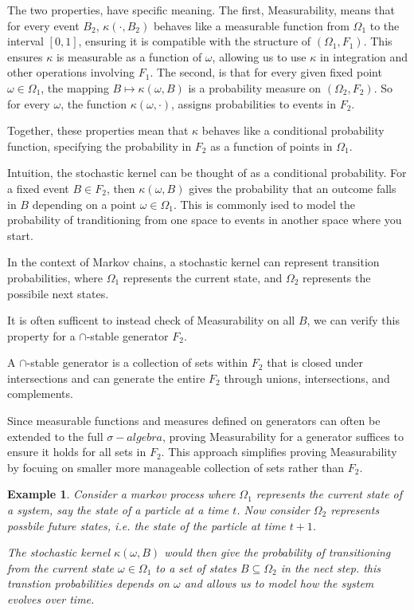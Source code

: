 \documentclass{article}
\newtheorem{example}{Example}
\begin{document}
The two properties, have specific meaning. The first, Measurability, means that for every event $B_2$, $\kappa(\cdot, B_2)$ behaves like a measurable function from $\Omega_1$ to the interval $[0,1]$, ensuring it is compatible with the structure of $(\Omega_1, F_1)$. This ensures $\kappa$ is measurable as a function of $\omega$, allowing us to use $\kappa$ in integration and other operations involving $F_1$. 
The second, is that for every given fixed point $\omega \in \Omega_1$, the mapping 
$B \mapsto \kappa(\omega, B)$ is a probability measure on 
$(\Omega_2, F_2)$. So for every $\omega$, the function $\kappa(\omega, \cdot)$, assigns probabilities to events in $F_2$. 
\par Together, these properties mean that $\kappa$ behaves like a conditional probability function, specifying the probability in $F_2$ as a function of points in $\Omega_1$. 
\par Intuition, the stochastic kernel can be thought of as a conditional probability. For a fixed event $B\in F_2$, then $\kappa(\omega, B)$ gives the probability that an outcome falls in $B$ depending on a point $\omega\in \Omega_1$. This is commonly ised to model the probability of tranditioning from one space to events in another space where you start.
\par In the context of Markov chains, a stochastic kernel can represent transition probabilities, where $\Omega_1$ represents the current state, and $\Omega_2$ represents the possibile next states.
\par It is often sufficent to instead check of Measurability on all $B$, we can verify this property for a $\cap$-stable generator $F_2$. 
\par A $\cap$-stable generator is a collection of sets within $F_2$ that is closed under intersections and can generate the entire $F_2$ through unions, intersections, and complements.
\par Since measurable functions and measures defined on generators can often be extended to the full $\sigma-algebra$, proving Measurability for a generator suffices to ensure it holds for all sets in $F_2$. This approach simplifies proving Measurability by focuing on smaller more manageable collection of sets rather than $F_2$. 
\begin{example}
    Consider a markov process where $\Omega_1$ represents the current state of a system, say the state of a particle at a time $t$. Now consider $\Omega_2$ represents possbile future states, i.e. the state of the particle at time $t+1$. 
    \par The stochastic kernel $\kappa(\omega, B)$ would then give the probability of transitioning from the current state $\omega\in \Omega_1$ to a set of states $B\subseteq \Omega_2$ in the nect step. this transtion probabilities depends on $\omega$ and allows us to model how the system evolves over time. 
\end{example}
\end{document}
